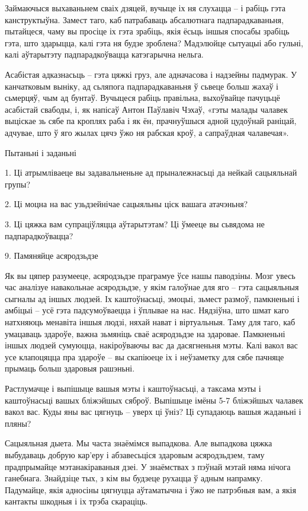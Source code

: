 Займаючыся выхаваньнем сваіх дзяцей, вучыце іх ня слухацца – і рабіць гэта канструктыўна. Замест таго, каб патрабаваць абсалютнага падпарадкаваньня, пытайцеся, чаму вы просіце іх гэта зрабіць, якія ёсьць іншыя спосабы зрабіць гэта, што здарыцца, калі гэта ня будзе зроблена? Мадэлюйце сытуацыі або гульні, калі аўтарытэту падпарадкоўвацца катэгарычна нельга. 

Асабістая адказнасьць – гэта цяжкі груз, але адначасова і надзейны падмурак. У канчатковым выніку, ад сьляпога падпарадкаваньня ў сьвеце больш жахаў і сьмерцяў, чым ад бунтаў. Вучыцеся рабіць правільна, выхоўвайце пачуцьцё асабістай свабоды, і, як напісаў Антон Паўлавіч Чэхаў, «гэты малады чалавек выціскае зь сябе па кроплях раба і як ён, прачнуўшыся адной цудоўнай раніцай, адчувае, што ў яго жылах цячэ ўжо ня рабская кроў, а сапраўдная чалавечая».

Пытаньні і заданьні

1. Ці атрымліваеце вы задавальненьне ад прыналежнасьці да нейкай сацыяльнай групы?

2. Ці моцна на вас узьдзейнічае сацыяльны ціск вашага атачэньня?

3. Ці цяжка вам супраціўляцца аўтарытэтам? Ці ўмееце вы сьвядома не падпарадкоўвацца?


9. Памяняйце асяродзьдзе

Як вы цяпер разумееце, асяродзьдзе праграмуе ўсе нашы паводзіны. Мозг увесь час аналізуе навакольнае асяродзьдзе, у якім галоўнае для яго – гэта сацыяльныя сыгналы ад іншых людзей. Іх каштоўнасьці, эмоцыі, зьмест размоў, памкненьні і амбіцыі – усё гэта падсумоўваецца і ўплывае на нас. Нядзіўна, што шмат каго натхняюць менавіта іншыя людзі, няхай нават і віртуальныя. Таму для таго, каб умацаваць здароўе, важна зьмяніць сваё асяродзьдзе на здаровае. Памкненьні іншых людзей сумуюцца, накіроўваючы вас да дасягненьня мэты. Калі вакол вас усе клапоцяцца пра здароўе – вы скапіюеце іх і неўзаметку для сябе пачняце прымаць больш здаровыя рашэньні.

Растлумачце і выпішыце вашыя мэты і каштоўнасьці, а таксама мэты і каштоўнасьці вашых бліжэйшых сяброў. Выпішыце імёны 5-7 бліжэйшых чалавек вакол вас. Куды яны вас цягнуць – уверх ці ўніз? Ці супадаюць вашыя жаданьні і пляны?

Сацыяльная дыета. Мы часта знаёмімся выпадкова. Але выпадкова цяжка выбудаваць добрую кар'еру і абзавесьціся здаровым асяродзьдзем, таму прадпрымайце мэтанакіраваныя дзеі. У знаёмствах з пэўнай мэтай няма нічога ганебнага. Знайдзіце тых, з кім вы будзеце рухацца ў адным напрамку. Падумайце, якія адносіны цягнуцца аўтаматычна і ўжо не патрэбныя вам, а якія кантакты шкодныя і іх трэба скараціць.

